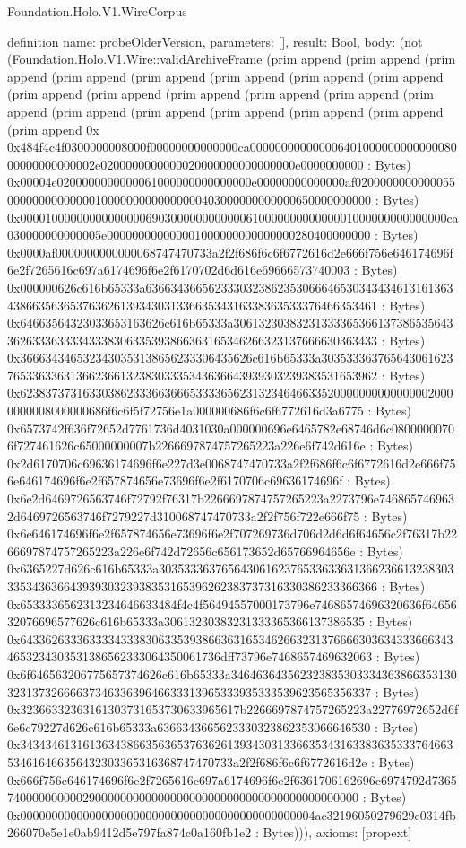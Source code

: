 \begin{lexlean}{Foundation.Holo.V1.WireCorpus}
\begin{semanticmodule}
definition{
  name: probeOlderVersion,
  parameters: [],
  result: Bool,
  body: (not (Foundation.Holo.V1.Wire::validArchiveFrame (prim append (prim append (prim append (prim append (prim append (prim append (prim append (prim append (prim append (prim append (prim append (prim append (prim append (prim append (prim append (prim append (prim append (prim append (prim append (prim append 0x 0x484f4c4f0300000008000f00000000000000ca00000000000000640100000000000008000000000000002e0200000000000020000000000000000e0000000000 : Bytes) 0x00004e0200000000000061000000000000000e00000000000000af02000000000000550000000000000010000000000000000403000000000000650000000000 : Bytes) 0x00001000000000000000690300000000000061000000000000001000000000000000ca030000000000005e000000000000001000000000000000280400000000 : Bytes) 0x0000af0000000000000068747470733a2f2f686f6c6f6772616d2e666f756e646174696f6e2f7265616c697a6174696f6e2f6170702d6d616e69666573740003 : Bytes) 0x000000626c616b65333a636634366562333032386235306664653034343461316136343866356365376362613934303133663534316338363533376466353461 : Bytes) 0x64663564323033653163626c616b65333a3061323038323133336536613738653564336263336333343338306335393866363165346266323137666630363433 : Bytes) 0x3666343465323430353138656233306435626c616b65333a30353336376564306162376533633631366236613238303335343636643939303239383531653962 : Bytes) 0x6238373731633038623336636665333365623132346466335200000000000000020000000008000000686f6c6f5f72756e1a000000686f6c6f6772616d3a6775 : Bytes) 0x6573742f636f72652d7761736d4031030a000000696e6465782e68746d6c08000000706f727461626c65000000007b2266697874757265223a226e6f742d616e : Bytes) 0x2d6170706c69636174696f6e227d3e0068747470733a2f2f686f6c6f6772616d2e666f756e646174696f6e2f657874656e73696f6e2f6170706c69636174696f : Bytes) 0x6e2d6469726563746f72792f76317b2266697874757265223a2273796e7468657469632d6469726563746f7279227d310068747470733a2f2f756f722e666f75 : Bytes) 0x6e646174696f6e2f657874656e73696f6e2f707269736d706d2d6d6f64656c2f76317b2266697874757265223a226e6f742d72656c656173652d65766964656e : Bytes) 0x6365227d626c616b65333a3035333637656430616237653363363136623661323830333534363664393930323938353165396262383737316330386233366366 : Bytes) 0x6533336562313234646633484f4c4f56494557000173796e74686574696320636f6465632076696577626c616b65333a30613230383231333365366137386535 : Bytes) 0x6433626333633334333830633539386636316534626632313766663036343336663434653234303531386562333064350061736dff73796e7468657469632063 : Bytes) 0x6f646563206775657374626c616b65333a3464636435623238353033343638663531303231373266663734633639646633313965333935333539623565356337 : Bytes) 0x32366332363161303731653730633965617b2266697874757265223a22776972652d6f6e6c79227d626c616b65333a6366343665623330323862353066646530 : Bytes) 0x343434613161363438663563653763626139343031336635343163383635333764663534616466356432303365316368747470733a2f2f686f6c6f6772616d2e : Bytes) 0x666f756e646174696f6e2f7265616c697a6174696f6e2f6361706162696c6974792d736574000000000029000000000000000000000000000000000000000000 : Bytes) 0x00000000000000000000000000000000000000000000004ac32196050279629e0314fb266070e5e1e0ab9412d5e797fa874c0a160fb1e2 : Bytes))),
  axioms: [propext]
}


\end{semanticmodule}
\end{lexlean}
